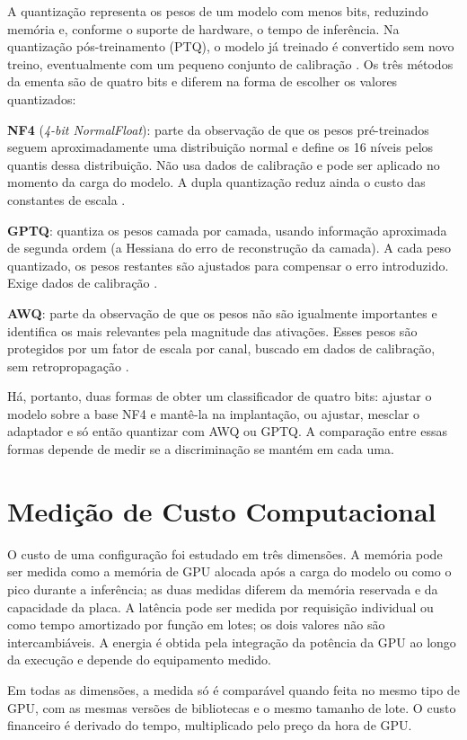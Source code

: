 A quantização representa os pesos de um modelo com menos bits, reduzindo memória e, conforme o suporte de hardware, o tempo de inferência. Na quantização pós-treinamento (PTQ), o modelo já treinado é convertido sem novo treino, eventualmente com um pequeno conjunto de calibração \cite{gholami2021survey}. Os três métodos da ementa são de quatro bits e diferem na forma de escolher os valores quantizados:

\begin{alineas}
    \item \textbf{NF4} (\textit{4-bit NormalFloat}): parte da observação de que os pesos pré-treinados seguem aproximadamente uma distribuição normal e define os 16 níveis pelos quantis dessa distribuição. Não usa dados de calibração e pode ser aplicado no momento da carga do modelo. A dupla quantização reduz ainda o custo das constantes de escala \cite{dettmers2023qlora}.
    \item \textbf{GPTQ}: quantiza os pesos camada por camada, usando informação aproximada de segunda ordem (a Hessiana do erro de reconstrução da camada). A cada peso quantizado, os pesos restantes são ajustados para compensar o erro introduzido. Exige dados de calibração \cite{frantar2023gptq}.
    \item \textbf{AWQ}: parte da observação de que os pesos não são igualmente importantes e identifica os mais relevantes pela magnitude das ativações. Esses pesos são protegidos por um fator de escala por canal, buscado em dados de calibração, sem retropropagação \cite{lin2024awq}.
\end{alineas}

Há, portanto, duas formas de obter um classificador de quatro bits: ajustar o modelo sobre a base NF4 e mantê-la na implantação, ou ajustar, mesclar o adaptador e só então quantizar com AWQ ou GPTQ. A comparação entre essas formas depende de medir se a discriminação se mantém em cada uma.

\section{Medição de Custo Computacional}

O custo de uma configuração foi estudado em três dimensões. A memória pode ser medida como a memória de GPU alocada após a carga do modelo ou como o pico durante a inferência; as duas medidas diferem da memória reservada e da capacidade da placa. A latência pode ser medida por requisição individual ou como tempo amortizado por função em lotes; os dois valores não são intercambiáveis. A energia é obtida pela integração da potência da GPU ao longo da execução e depende do equipamento medido.

Em todas as dimensões, a medida só é comparável quando feita no mesmo tipo de GPU, com as mesmas versões de bibliotecas e o mesmo tamanho de lote. O custo financeiro é derivado do tempo, multiplicado pelo preço da hora de GPU.
